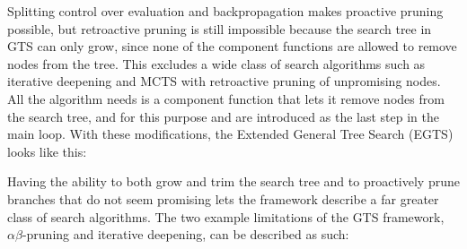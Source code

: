 Splitting control over evaluation and backpropagation makes proactive pruning possible, but retroactive pruning is still impossible because the search tree in GTS can only grow, since none of the component functions are allowed to remove nodes from the tree. This excludes a wide class of search algorithms such as iterative deepening and MCTS with retroactive pruning of unpromising nodes. All the algorithm needs is a component function that lets it remove nodes from the search tree, and for this purpose \trim and \shtrim are introduced as the last step in the main loop. With these modifications, the Extended General Tree Search (EGTS) looks like this:



% 

Having the ability to both grow and trim the search tree and to proactively prune branches that do not seem promising lets the framework describe a far greater class of search algorithms. The two example limitations of the GTS framework, $\alpha\beta$-pruning and iterative deepening, can be described as such:

